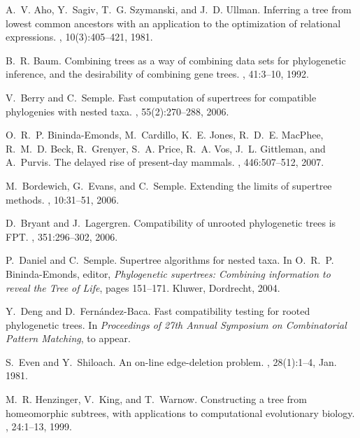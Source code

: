 \documentclass[11pt]{article}
\theoremstyle{definition}
\begin{document}
\begin{thebibliography}{10}

A.~V. Aho, Y.~Sagiv, T.~G. Szymanski, and J.~D. Ullman.
\newblock Inferring a tree from lowest common ancestors with an application to
  the optimization of relational expressions.
, 10(3):405--421, 1981.

B.~R. Baum.
\newblock Combining trees as a way of combining data sets for phylogenetic
  inference, and the desirability of combining gene trees.
, 41:3--10, 1992.

V.~Berry and C.~Semple.
\newblock Fast computation of supertrees for compatible phylogenies with nested
  taxa.
, 55(2):270--288, 2006.

O.~R.~P. Bininda-Emonds, M.~Cardillo, K.~E. Jones, R.~D.~E. MacPhee, R.~M.~D.
  Beck, R.~Grenyer, S.~A. Price, R.~A. Vos, J.~L. Gittleman, and A.~Purvis.
\newblock The delayed rise of present-day mammals.
, 446:507--512, 2007.

M.~Bordewich, G.~Evans, and C.~Semple.
\newblock Extending the limits of supertree methods.
, 10:31--51, 2006.

D.~Bryant and J.~Lagergren.
\newblock Compatibility of unrooted phylogenetic trees is {FPT}.
, 351:296--302, 2006.

P.~Daniel and C.~Semple.
\newblock Supertree algorithms for nested taxa.
\newblock In O.~R.~P. Bininda-Emonds, editor, {\em Phylogenetic supertrees:
  Combining information to reveal the Tree of Life}, pages 151--171. Kluwer,
  Dordrecht, 2004.

Y.~Deng and D.~Fern\'andez-Baca.
\newblock Fast compatibility testing for rooted phylogenetic trees.
\newblock In {\em Proceedings of 27th Annual Symposium on Combinatorial Pattern
  Matching}, to appear.

S.~Even and Y.~Shiloach.
\newblock An on-line edge-deletion problem.
, 28(1):1--4, Jan. 1981.

M.~R. Henzinger, V.~King, and T.~Warnow.
\newblock Constructing a tree from homeomorphic subtrees, with applications to
  computational evolutionary biology.
, 24:1--13, 1999.


\end{thebibliography}
\end{document}

